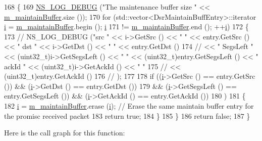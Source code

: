 \begin{DoxyCode}
168 \{
169   \hyperlink{group__logging_ga413f1886406d49f59a6a0a89b77b4d0a}{NS\_LOG\_DEBUG} (\textcolor{stringliteral}{"The maintenance buffer size "} << \hyperlink{classns3_1_1dsr_1_1DsrMaintainBuffer_a942fc86793c5a6f538a9f0bd69709ce9}{m\_maintainBuffer}.size ());
170   \textcolor{keywordflow}{for} (std::vector<DsrMaintainBuffEntry>::iterator \hyperlink{bernuolliDistribution_8m_a6f6ccfcf58b31cb6412107d9d5281426}{i} = \hyperlink{classns3_1_1dsr_1_1DsrMaintainBuffer_a942fc86793c5a6f538a9f0bd69709ce9}{m\_maintainBuffer}.begin (); 
      \hyperlink{bernuolliDistribution_8m_a6f6ccfcf58b31cb6412107d9d5281426}{i}
171        != \hyperlink{classns3_1_1dsr_1_1DsrMaintainBuffer_a942fc86793c5a6f538a9f0bd69709ce9}{m\_maintainBuffer}.end (); ++\hyperlink{bernuolliDistribution_8m_a6f6ccfcf58b31cb6412107d9d5281426}{i})
172     \{
173 \textcolor{comment}{//      NS\_LOG\_DEBUG ("src " << i->GetSrc () << " " << entry.GetSrc () << " dst " << i->GetDst () << " " <<
       entry.GetDst ()}
174 \textcolor{comment}{//                           << " SegsLeft " << (uint32\_t)i->GetSegsLeft () << " " <<
       (uint32\_t)entry.GetSegsLeft () << " ackId " << (uint32\_t)i->GetAckId () << " "}
175 \textcolor{comment}{//                           << (uint32\_t)entry.GetAckId ()}
176 \textcolor{comment}{//                    );}
177 
178       \textcolor{keywordflow}{if} ((\hyperlink{bernuolliDistribution_8m_a6f6ccfcf58b31cb6412107d9d5281426}{i}->GetSrc () == entry.GetSrc ()) && (\hyperlink{bernuolliDistribution_8m_a6f6ccfcf58b31cb6412107d9d5281426}{i}->GetDst () == entry.GetDst ())
179           && (\hyperlink{bernuolliDistribution_8m_a6f6ccfcf58b31cb6412107d9d5281426}{i}->GetSegsLeft () == entry.GetSegsLeft ()) && (\hyperlink{bernuolliDistribution_8m_a6f6ccfcf58b31cb6412107d9d5281426}{i}->GetAckId () == entry.GetAckId ())
180           )
181         \{
182           \hyperlink{bernuolliDistribution_8m_a6f6ccfcf58b31cb6412107d9d5281426}{i} = \hyperlink{classns3_1_1dsr_1_1DsrMaintainBuffer_a942fc86793c5a6f538a9f0bd69709ce9}{m\_maintainBuffer}.erase (\hyperlink{bernuolliDistribution_8m_a6f6ccfcf58b31cb6412107d9d5281426}{i});   \textcolor{comment}{// Erase the same maintain buffer entry for
       the promisc received packet}
183           \textcolor{keywordflow}{return} \textcolor{keyword}{true};
184         \}
185     \}
186   \textcolor{keywordflow}{return} \textcolor{keyword}{false};
187 \}
\end{DoxyCode}


Here is the call graph for this function\+:




